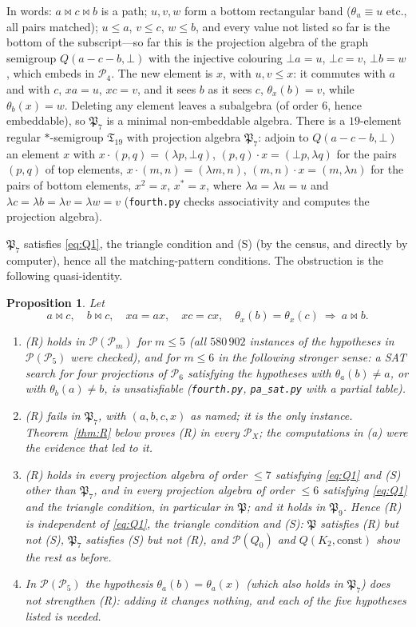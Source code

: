 \documentclass[11pt]{amsart}
\newtheorem{proposition}[theorem]{Proposition}
\theoremstyle{definition}
\renewcommand{\P}{\mathcal{P}}
\newcommand{\mt}{\bowtie}   %
\begin{document}
In words: $a\mt c\mt b$ is a path; $u,v,w$ form a bottom rectangular band ($\theta_u\equiv u$ etc., all pairs matched); $u\le a$, $v\le c$, $w\le b$, and every value not listed so far is the bottom of the subscript---so far this is the projection algebra of the graph semigroup $Q(a-c-b,\bot)$ with the injective colouring $\bot a=u$, $\bot c=v$, $\bot b=w$, which embeds in $\P_4$. The new element is $x$, with $u,v\le x$: it commutes with $a$ and with $c$, $xa=u$, $xc=v$, and it sees $b$ as it sees $c$, $\theta_x(b)=v$, while $\theta_b(x)=w$. Deleting any element leaves a subalgebra (of order $6$, hence embeddable), so $\mathfrak P_7$ is a minimal non-embeddable algebra. There is a $19$-element regular $*$-semigroup $\mathfrak T_{19}$ with projection algebra $\mathfrak P_7$: adjoin to $Q(a-c-b,\bot)$ an element $x$ with $x\cdot(p,q)=(\lambda p,\bot q)$, $(p,q)\cdot x=(\bot p,\lambda q)$ for the pairs $(p,q)$ of top elements, $x\cdot(m,n)=(\lambda m,n)$, $(m,n)\cdot x=(m,\lambda n)$ for the pairs of bottom elements, $x^2=x$, $x^*=x$, where $\lambda a=\lambda u=u$ and $\lambda c=\lambda b=\lambda v=\lambda w=v$ (\texttt{fourth.py} checks associativity and computes the projection algebra).

$\mathfrak P_7$ satisfies \eqref{eq:Q1}, the triangle condition and (S) (by the census, and directly by computer), hence all the matching-pattern conditions. The obstruction is the following quasi-identity.

\begin{proposition}\label{prop:R}
Let
\[
a\mt c,\quad b\mt c,\quad xa=ax,\quad xc=cx,\quad \theta_x(b)=\theta_x(c)\ \Longrightarrow\ a\mt b .
\tag{R}
\]
\begin{enumerate}[label=\textup{(\alph*)},nosep]
\item (R) holds in $\P(\P_m)$ for $m\le5$ (all $580\,902$ instances of the hypotheses in $\P(\P_5)$ were checked), and for $m\le6$ in the following stronger sense: a SAT search for four projections of $\P_6$ satisfying the hypotheses with $\theta_a(b)\ne a$, or with $\theta_b(a)\ne b$, is unsatisfiable (\texttt{fourth.py}, \texttt{pa\_sat.py} with a partial table).
\item (R) fails in $\mathfrak P_7$, with $(a,b,c,x)$ as named; it is the only instance. Theorem~\ref{thm:R} below proves (R) in every $\P_X$; the computations in (a) were the evidence that led to it.
\item (R) holds in every projection algebra of order $\le7$ satisfying \eqref{eq:Q1} and (S) other than $\mathfrak P_7$, and in every projection algebra of order $\le6$ satisfying \eqref{eq:Q1} and the triangle condition, in particular in $\mathfrak P$; and it holds in $\mathfrak P_9$. Hence (R) is independent of \eqref{eq:Q1}, the triangle condition and (S): $\mathfrak P$ satisfies (R) but not (S), $\mathfrak P_7$ satisfies (S) but not (R), and $\P(Q_0)$ and $Q(K_2,\text{const})$ show the rest as before.
\item In $\P(\P_5)$ the hypothesis $\theta_a(b)=\theta_a(x)$ (which also holds in $\mathfrak P_7$) does not strengthen (R): adding it changes nothing, and each of the five hypotheses listed is needed.
\end{enumerate}
\end{proposition}
\end{document}
